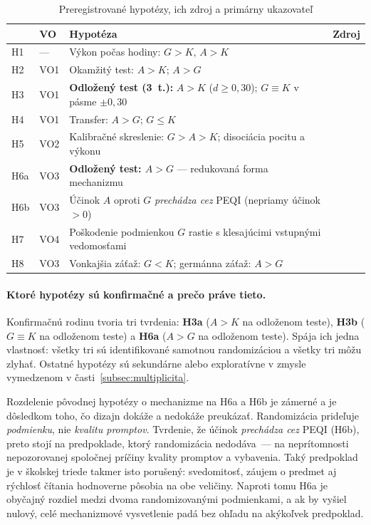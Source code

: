 \begin{table}[H]
\centering
\caption{Pre\-re\-gis\-tro\-va\-né hypotézy, ich zdroj a primárny ukazovateľ}
\label{tab:hypotezy}
\small
\begin{tabularx}{\textwidth}{@{}l l X l@{}}
\toprule
& \textbf{VO} & \textbf{Hypotéza} & \textbf{Zdroj} \\
\midrule
H1 & --- & Výkon počas hodiny: $G>K$, $A>K$ & \cite{bastani2025harm} \\
H2 & VO1 & Okamžitý test: $A>K$; $A>G$ & \cite{kestin2025aitutoring} \\
H3 & VO1 & \textbf{Odložený test (3~t.):} $A>K$ ($d\geq0{,}30$); $G\equiv K$ v pásme $\pm0{,}30$ & \cite{bastani2025harm} \\
H4 & VO1 & Transfer: $A>G$; $G\leq K$ & \cite{bjork2011desirable} \\
H5 & VO2 & Kalibračné skreslenie: $G>A>K$; disociácia pocitu a výkonu & \cite{deslauriers2019feeling} \\
H6a & VO3 & \textbf{Odložený test: $A>G$} --- redukovaná forma mechanizmu & \cite{bastani2025harm} \\
H6b & VO3 & Účinok $A$ oproti $G$ \emph{prechádza cez} PEQI (nepriamy účinok $>0$) & \cite{chi2014icap,gerlich2025offloading} \\
H7 & VO4 & Poškodenie podmienkou $G$ rastie s klesajúcimi vstupnými vedomosťami & \cite{kalyuga2003expertise,bastani2025harm} \\
H8 & VO3 & Vonkajšia záťaž: $G<K$; germánna záťaž: $A>G$ & \cite{leppink2013load,sweller2019twenty} \\
\bottomrule
\end{tabularx}
\end{table}

\paragraph{Ktoré hypotézy sú konfirmačné a prečo práve tieto.} Konfirmačnú rodinu tvoria tri tvrdenia: \textbf{H3a} ($A>K$ na odloženom teste), \textbf{H3b} ($G\equiv K$ na odloženom teste) a \textbf{H6a} ($A>G$ na odloženom teste). Spája ich jedna vlastnosť: všetky tri sú identifikované samotnou randomizáciou a všetky tri môžu zlyhať. Ostatné hypotézy sú sekundárne alebo exploratívne v zmysle vymedzenom v časti~\ref{subsec:multiplicita}.

Rozdelenie pôvodnej hypotézy o mechanizme na H6a a H6b je zámerné a je dôsledkom toho, čo dizajn dokáže a nedokáže preukázať. Randomizácia prideľuje \emph{podmienku}, nie \emph{kvalitu promptov}. Tvrdenie, že účinok \emph{prechádza cez} PEQI (H6b), preto stojí na predpoklade, ktorý randomizácia nedodáva~--- na neprítomnosti nepozorovanej spoločnej príčiny kvality promptov a vybavenia. Taký predpoklad je v školskej triede takmer isto porušený: svedomitosť, záujem o predmet aj rýchlosť čítania hodnoverne pôsobia na obe veličiny. Naproti tomu H6a je obyčajný rozdiel medzi dvoma randomizovanými podmienkami, a ak by vyšiel nulový, celé mechanizmové vysvetlenie padá bez ohľadu na akýkoľvek predpoklad.

